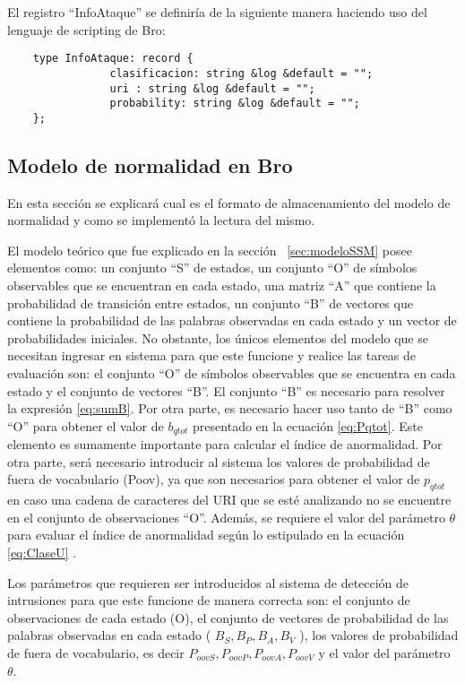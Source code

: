     El registro “InfoAtaque” se definiría de la siguiente manera haciendo uso del lenguaje de scripting de Bro:

\begin{verbatim}
    type InfoAtaque: record {
                clasificacion: string &log &default = "";
                uri : string &log &default = "";
                probability: string &log &default = "";
    }; 
\end{verbatim}

\subsection{Modelo de normalidad en Bro}
\label{sec:lecturaModelo}
En esta sección se explicará cual es el formato de almacenamiento del modelo de normalidad y como se implementó la lectura del mismo. 





El modelo teórico que fue explicado en la sección ~\ref{sec:modeloSSM} posee elementos como: un conjunto “S” de estados, un conjunto “O” de símbolos observables que se encuentran en cada estado, una matriz “A” que contiene la probabilidad de transición entre estados, un conjunto “B” de vectores que contiene la probabilidad de las palabras observadas en cada estado y un vector de probabilidades iniciales. No obstante, los únicos elementos del modelo que se necesitan ingresar en sistema para que este funcione y realice las tareas de evaluación son: el conjunto “O” de símbolos observables que se encuentra en cada estado y el conjunto de vectores “B”. El conjunto “B” es necesario para resolver la expresión \ref{eq:sumB}. Por otra parte, es necesario hacer uso tanto de “B” como “O” para obtener el valor de $b_{qtot}$ presentado en la ecuación \ref{eq:Pqtot}. Este elemento es sumamente importante para calcular el índice de anormalidad. Por otra parte, será necesario introducir al sistema los valores de probabilidad de fuera de vocabulario (Poov), ya que son necesarios para obtener el valor de $p_{qtot}$ en caso una cadena de caracteres del URI que se esté analizando no se encuentre en el conjunto de observaciones “O”. Además, se requiere el valor del parámetro $\theta$ para evaluar el índice de anormalidad según lo estipulado en la ecuación \ref{eq:ClaseU} .

    Los parámetros que requieren ser introducidos al sistema de detección de intrusiones para que este funcione de manera correcta son: el conjunto de observaciones de cada estado (O), el conjunto de vectores de probabilidad de las palabras observadas en cada estado ( $B_{S}, B_{P}, B_{A}, B_{V}$ ), los valores de probabilidad de fuera de vocabulario, es decir $P_{oovS}, P_{oovP}, P_{oovA}, P_{oovV}$ y el valor del parámetro $\theta$.

